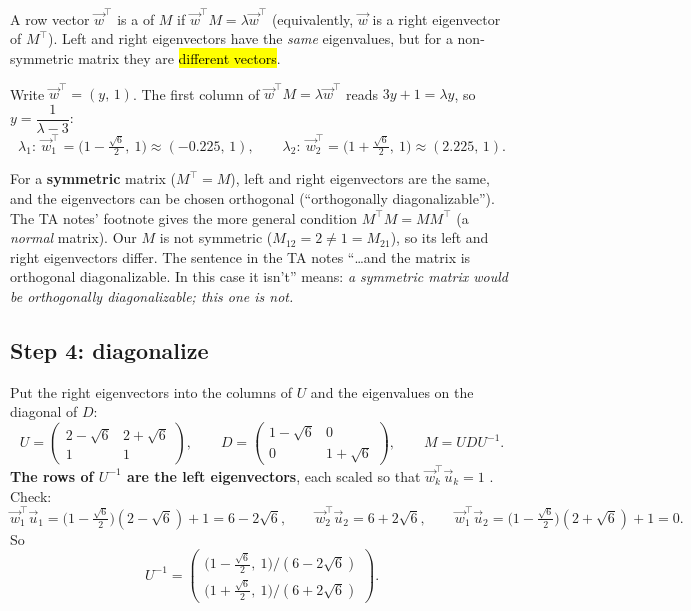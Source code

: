 \begin{defn}
A row vector $\vec w^\top$ is a  of $M$ if $\vec w^\top M = \lambda\vec w^\top$ (equivalently, $\vec w$ is a right eigenvector of $M^\top$).
Left and right eigenvectors have the \emph{same} eigenvalues, but for a non-symmetric matrix they are \hl{different vectors}.
\end{defn}

Write $\vec w^\top = (y,\,1)$. The first column of $\vec w^\top M = \lambda \vec w^\top$ reads $3y + 1 = \lambda y$, so $y = \dfrac{1}{\lambda-3}$:
\[ \lambda_1:\ \vec w_1^\top = \Big(1-\tfrac{\sqrt6}{2},\ 1\Big)\approx(-0.225,\,1), \qquad
   \lambda_2:\ \vec w_2^\top = \Big(1+\tfrac{\sqrt6}{2},\ 1\Big)\approx(2.225,\,1). \]

\begin{pitfall}
For a \textbf{symmetric} matrix ($M^\top = M$), left and right eigenvectors are the same, and the eigenvectors can be chosen
orthogonal (``orthogonally diagonalizable''). The TA notes' footnote gives the more general condition $M^\top M = MM^\top$ (a \emph{normal}
matrix). Our $M$ is not symmetric ($M_{12}=2\neq1=M_{21}$), so its left and right eigenvectors differ. The sentence in the TA
notes ``\dots and the matrix is orthogonal diagonalizable. In this case it isn't'' means: \emph{a symmetric matrix would be orthogonally diagonalizable; this one is not.}
\end{pitfall}

\subsection{Step 4: diagonalize}

Put the right eigenvectors into the columns of $U$ and the eigenvalues on the diagonal of $D$:
\[ U = \begin{pmatrix}2-\sqrt6 & 2+\sqrt6\\ 1 & 1\end{pmatrix},\qquad
   D = \begin{pmatrix}1-\sqrt6 & 0\\ 0 & 1+\sqrt6\end{pmatrix},\qquad
   \boxed{M = U D U^{-1}}. \]
\textbf{The rows of $U^{-1}$ are the left eigenvectors}, each scaled so that $\vec w_k^\top\vec u_k = 1$ . Check:
\[ \vec w_1^\top\vec u_1 = \big(1-\tfrac{\sqrt6}{2}\big)(2-\sqrt6) + 1 = 6-2\sqrt6,\qquad
   \vec w_2^\top\vec u_2 = 6+2\sqrt6,\qquad
   \vec w_1^\top\vec u_2 = \big(1-\tfrac{\sqrt6}{2}\big)(2+\sqrt6)+1 = 0. \]
So
\[ U^{-1} = \begin{pmatrix} \big(1-\tfrac{\sqrt6}{2},\ 1\big)\big/(6-2\sqrt6)\\[3pt] \big(1+\tfrac{\sqrt6}{2},\ 1\big)\big/(6+2\sqrt6)\end{pmatrix}. \]

